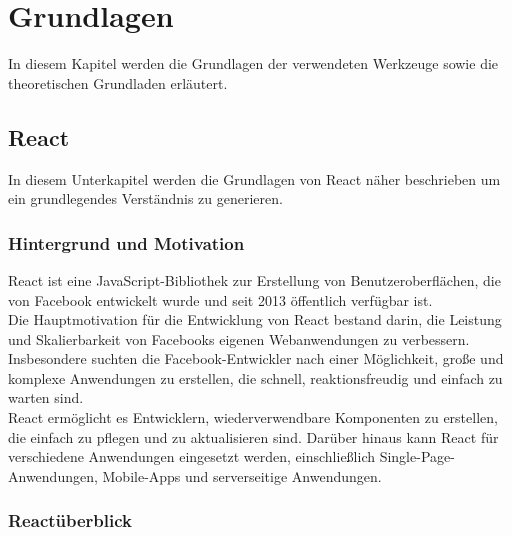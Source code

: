 



\chapter{Grundlagen}
In diesem Kapitel werden die Grundlagen der verwendeten Werkzeuge sowie die theoretischen Grundladen erläutert.
\section{React}
In diesem Unterkapitel werden die Grundlagen von React näher beschrieben um ein grundlegendes Verständnis zu generieren.

\subsection{Hintergrund und Motivation}
React ist eine JavaScript-Bibliothek zur Erstellung von Benutzeroberflächen, die von Facebook entwickelt wurde und seit 2013 öffentlich verfügbar ist.\cite{ReactGettingStarted} \\Die Hauptmotivation für die Entwicklung von React bestand darin, die Leistung und Skalierbarkeit von Facebooks eigenen Webanwendungen zu verbessern. Insbesondere suchten die Facebook-Entwickler nach einer Möglichkeit, große und komplexe Anwendungen zu erstellen, die schnell, reaktionsfreudig und einfach zu warten sind.\\
React ermöglicht es Entwicklern, wiederverwendbare Komponenten zu erstellen, die einfach zu pflegen und zu aktualisieren sind. Darüber hinaus kann React für verschiedene Anwendungen eingesetzt werden, einschließlich Single-Page-Anwendungen, Mobile-Apps und serverseitige Anwendungen.

\subsection{Reactüberblick}

